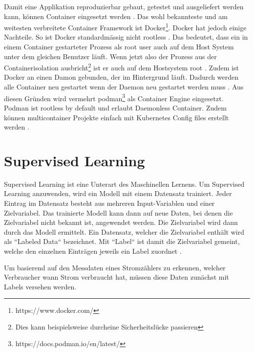 
Damit eine Applikation reproduzierbar
gebaut, getestet und ausgeliefert werden kann, können Container eingesetzt werden \parencite{what-is-a-container}.
Das wohl bekannteste und am weitesten verbreitete Container Framework
ist Docker\footnote{https://www.docker.com/}. Docker hat jedoch einige Nachteile.
So ist Docker standardmässig nicht rootless \parencite{docker:rootless}.
Das bedeutet, dass ein in einem Container gestarteter Prozess als root user
auch auf dem Host System unter dem gleichen Benutzer läuft.
Wenn jetzt also
der Prozess aus der Containerisolation ausbricht\footnote{Dies kann beispielsweise durcheine Sicherheitslücke passieren}
ist er auch auf dem Hostsystem root \parencite{so_2020}.
Zudem ist Docker an einen Damon gebunden, der im Hintergrund läuft.
Dadurch werden alle Container neu gestartet wenn der Daemon neu gestartet werden muss \parencite{docker:daemon}.
Aus diesen Gründen wird vermehrt podman\footnote{https://docs.podman.io/en/latest/}
als Container Engine eingesetzt.
Podman ist rootless by default und erlaubt Daemonless Container.
Zudem können multicontainer Projekte einfach mit Kubernetes Config files
erstellt werden \parencite{redhat:podman-pods}.

\section{Supervised Learning}
\label{state:supervised-learning}

Supervised Learning ist eine Unterart des Maschinellen Lernens.
Um Supervised Learning anzuwenden, wird ein Modell mit einem Datensatz trainiert.
Jeder Eintrag im Datensatz besteht aus mehreren Input-Variablen und einer Zielvariabel.
Das trainierte Modell kann dann auf neue Daten, bei denen die Zielvariabel nicht bekannt ist, angewendet werden.
Die Zielvariabel wird dann durch das Modell ermittelt.
Ein Datensatz, welcher die Zielvariabel enthält wird als ``Labeled Data`` bezeichnet.
Mit ``Label`` ist damit die Zielvariabel gemeint,
welche den einzelnen Einträgen jeweils ein Label zuordnet \parencite{ml_for_dummies}.

Um basierend auf den Messdaten eines Stromzählers zu erkennen,
welcher Verbraucher wann Strom verbraucht hat,
müssen diese Daten zunächst mit Labels versehen werden.


